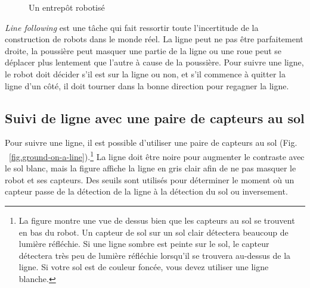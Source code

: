 {\begin{figure}
\begin{center}
\caption{Un entrepôt robotisé}\label{fig.warehouse}
\end{center}
\end{figure}

\emph{Line following} est une tâche qui fait ressortir toute l'incertitude de la construction de robots dans le monde réel. La ligne peut ne pas être parfaitement droite, la poussière peut masquer une partie de la ligne ou une roue peut se déplacer plus lentement que l'autre à cause de la poussière. Pour suivre une ligne, le robot doit décider s'il est sur la ligne ou non, et s'il commence à quitter la ligne d'un côté, il doit tourner dans la bonne direction pour regagner la ligne.


\subsection{Suivi de ligne avec une paire de capteurs au sol}

Pour suivre une ligne, il est possible d'utiliser une paire de capteurs au sol (Fig. ~\ref{fig.ground-on-a-line}).\footnote{La figure montre une vue de dessus bien que les capteurs au sol se trouvent en bas du robot. Un capteur de sol sur un sol clair détectera beaucoup de lumière réfléchie. Si une ligne sombre est peinte sur le sol, le capteur détectera très peu de lumière réfléchie lorsqu'il se trouvera au-dessus de la ligne. Si votre sol est de couleur foncée, vous devez utiliser une ligne blanche.} La ligne doit être noire pour augmenter le contraste avec le sol blanc, mais la figure affiche la ligne en gris clair afin de ne pas masquer le robot et ses capteurs. Des seuils sont utilisés pour déterminer le moment où un capteur passe de la détection de la ligne à la détection du sol ou inversement.

}
